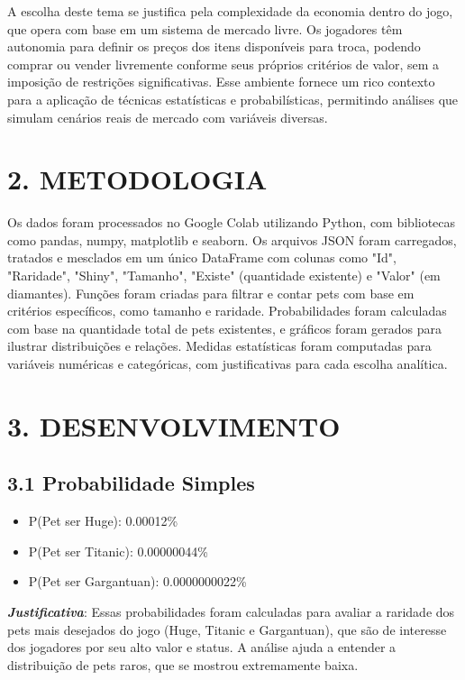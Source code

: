 \documentclass[12pt]{article}
\begin{document}
A escolha deste tema se justifica pela complexidade da economia dentro do jogo, que opera com base em um sistema de mercado livre. Os jogadores têm autonomia para definir os preços dos itens disponíveis para troca, podendo comprar ou vender livremente conforme seus próprios critérios de valor, sem a imposição de restrições significativas. Esse ambiente fornece um rico contexto para a aplicação de técnicas estatísticas e probabilísticas, permitindo análises que simulam cenários reais de mercado com variáveis diversas.

\section*{2. METODOLOGIA}
Os dados foram processados no Google Colab utilizando Python, com bibliotecas como pandas, numpy, matplotlib e seaborn. Os arquivos JSON foram carregados, tratados e mesclados em um único DataFrame com colunas como "Id", "Raridade", "Shiny", "Tamanho", "Existe" (quantidade existente) e "Valor" (em diamantes). Funções foram criadas para filtrar e contar pets com base em critérios específicos, como tamanho e raridade. Probabilidades foram calculadas com base na quantidade total de pets existentes, e gráficos foram gerados para ilustrar distribuições e relações. Medidas estatísticas foram computadas para variáveis numéricas e categóricas, com justificativas para cada escolha analítica.

\section*{3. DESENVOLVIMENTO}

\subsection*{3.1 Probabilidade Simples}
\begin{itemize}
    \item P(Pet ser Huge): 0.00012\%
    \item P(Pet ser Titanic): 0.00000044\%
    \item P(Pet ser Gargantuan): 0.0000000022\%
\end{itemize}
\textbf{\textit{Justificativa}}: Essas probabilidades foram calculadas para avaliar a raridade dos pets mais desejados do jogo (Huge, Titanic e Gargantuan), que são de interesse dos jogadores por seu alto valor e status. A análise ajuda a entender a distribuição de pets raros, que se mostrou extremamente baixa.
\end{document}

